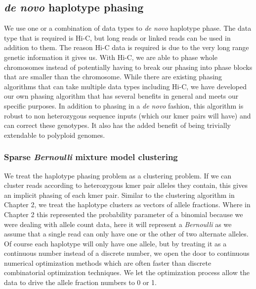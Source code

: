 \subsection{\textit{de novo} haplotype phasing}

\par{
We use one or a combination of data types to \textit{de novo} haplotype phase. The data type that is required is Hi-C, but long reads or linked reads can be used in addition to them. The reason Hi-C data is required is due to the very long range genetic information it gives us. With Hi-C, we are able to phase whole chromosomes instead of potentially having to break our phasing into phase blocks that are smaller than the chromosome. While there are existing phasing algorithms that can take multiple data types including Hi-C\cite{hapcut2}\cite{HICphasing}, we have developed our own phasing algorithm that has several benefits in general and meets our specific purposes. In addition to phasing in a \textit{de novo} fashion, this algorithm is robust to non heterozygous sequence inputs (which our kmer pairs will have) and can correct these genotypes. It also has the added benefit of being trivially extendable to polyploid genomes.
}

\subsubsection{Sparse \textit{Bernoulli} mixture model clustering}

\par{
We treat the haplotype phasing problem as a clustering problem. If we can cluster reads according to heterozygous kmer pair alleles they contain, this gives an implicit phasing of each kmer pair. Similar to the clustering algorithm in Chapter 2, we treat the haplotype clusters as vectors of allele fractions. Where in Chapter 2 this represented the probability parameter of a binomial because we were dealing with allele count data, here it will represent a \textit{Bernoulli} as we assume that a single read can only have one or the other of two alternate alleles. Of course each haplotype will only have one allele, but by treating it as a continuous number instead of a discrete number, we open the door to continuous numerical optimization methods which are often faster than discrete combinatorial optimization techniques. We let the optimization process allow the data to drive the allele fraction numbers to 0 or 1. 
}

